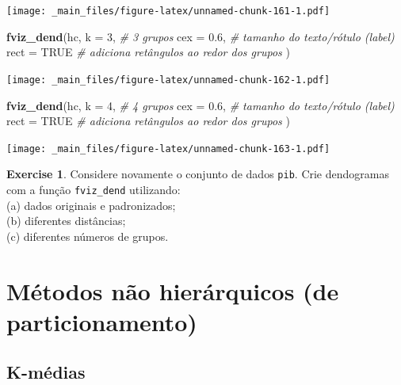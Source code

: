 \documentclass[
]{book}
\newenvironment{Shaded}{\begin{snugshade}}{\end{snugshade}}
\newcommand{\CommentTok}[1]{\textcolor[rgb]{0.56,0.35,0.01}{\textit{#1}}}
\newcommand{\DataTypeTok}[1]{\textcolor[rgb]{0.13,0.29,0.53}{#1}}
\newcommand{\DecValTok}[1]{\textcolor[rgb]{0.00,0.00,0.81}{#1}}
\newcommand{\FloatTok}[1]{\textcolor[rgb]{0.00,0.00,0.81}{#1}}
\newcommand{\KeywordTok}[1]{\textcolor[rgb]{0.13,0.29,0.53}{\textbf{#1}}}
\newcommand{\NormalTok}[1]{#1}
\newcommand{\OtherTok}[1]{\textcolor[rgb]{0.56,0.35,0.01}{#1}}
\theoremstyle{definition}
\theoremstyle{definition}
\theoremstyle{definition}
\newtheorem{exercise}{Exercise}[chapter]
\theoremstyle{remark}
\begin{document}
\texttt{[image: \_main\_files/figure-latex/unnamed-chunk-161-1.pdf]}

\begin{Shaded}
\begin{Highlighting}[]
\KeywordTok{fviz\_dend}\NormalTok{(hc, }\DataTypeTok{k =} \DecValTok{3}\NormalTok{,  }\CommentTok{\# 3 grupos}
          \DataTypeTok{cex =} \FloatTok{0.6}\NormalTok{,  }\CommentTok{\# tamanho do texto/rótulo (label)}
          \DataTypeTok{rect =} \OtherTok{TRUE} \CommentTok{\# adiciona retângulos ao redor dos grupos}
\NormalTok{)}
\end{Highlighting}
\end{Shaded}

\texttt{[image: \_main\_files/figure-latex/unnamed-chunk-162-1.pdf]}

\begin{Shaded}
\begin{Highlighting}[]
\KeywordTok{fviz\_dend}\NormalTok{(hc, }\DataTypeTok{k =} \DecValTok{4}\NormalTok{,  }\CommentTok{\# 4 grupos}
          \DataTypeTok{cex =} \FloatTok{0.6}\NormalTok{,  }\CommentTok{\# tamanho do texto/rótulo (label)}
          \DataTypeTok{rect =} \OtherTok{TRUE} \CommentTok{\# adiciona retângulos ao redor dos grupos}
\NormalTok{)}
\end{Highlighting}
\end{Shaded}

\texttt{[image: \_main\_files/figure-latex/unnamed-chunk-163-1.pdf]}

\begin{exercise}
\protect\hypertarget{exr:unnamed-chunk-164}{}{\label{exr:unnamed-chunk-164} }Considere novamente o conjunto de dados \texttt{pib}. Crie dendogramas com a função \texttt{fviz\_dend} utilizando:\\
(a) dados originais e padronizados;\\
(b) diferentes distâncias;\\
(c) diferentes números de grupos.
\end{exercise}

\hypertarget{muxe9todos-nuxe3o-hieruxe1rquicos-de-particionamento}{%
\section{Métodos não hierárquicos (de particionamento)}\label{muxe9todos-nuxe3o-hieruxe1rquicos-de-particionamento}}

\hypertarget{k-muxe9dias}{%
\subsection{K-médias}\label{k-muxe9dias}}
\end{document}
